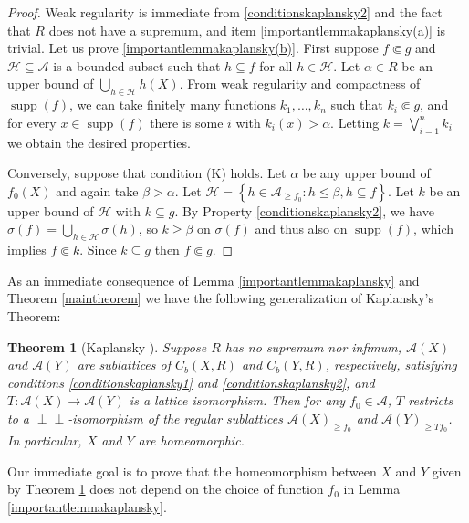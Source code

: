 \documentclass[letter,11pt]{amsart}
\theoremstyle{plain}		\newtheorem{theorem}[generalnumbering]{Theorem}
\theoremstyle{plain}		\newtheorem{corollary}[generalnumbering]{Corollary}
\theoremstyle{definition}		\newtheorem{definition}[generalnumbering]{Definition}
\theoremstyle{definition}		\newtheorem{example}[generalnumbering]{Example}
\theoremstyle{plain}		\newtheorem{proposition}[generalnumbering]{Proposition}
\theoremstyle{plain}		\newtheorem{lemma}[generalnumbering]{Lemma}
\theoremstyle{plain}    \newtheorem{plainstyle}[generalnumbering]{\namefordifferentenvironment}
\theoremstyle{plain}    \newtheorem*{plainstyle*}{\namefordifferentenvironment}
\theoremstyle{definition}    \newtheorem{definitionstyle}[generalnumbering]{\namefordifferentenvironment}
\theoremstyle{definition}    \newtheorem*{definitionstyle*}{\namefordifferentenvironment}
\newcommand{\perpp}{\perp\!\!\!\perp}
\DeclareMathOperator{\supp}{supp}
\begin{document}
\begin{proof}
	Weak regularity is immediate from \ref{conditionskaplansky2} and the fact that $R$ does not have a supremum, and item \ref{importantlemmakaplansky(a)} is trivial. Let us prove \ref{importantlemmakaplansky(b)}. First suppose $f\Subset g$ and $\mathcal{H}\subseteq\mathcal{A}$ is a bounded subset such that $h\subseteq f$ for all $h\in \mathcal{H}$. Let $\alpha\in R$ be an upper bound of $\bigcup_{h\in\mathcal{H}}h(X)$. From weak regularity and compactness of $\supp(f)$, we can take finitely many functions $k_1,\ldots,k_n$ such that $k_i\Subset g$, and for every $x\in\supp(f)$ there is some $i$ with $k_i(x)>\alpha$. Letting $k=\bigvee_{i=1}^n k_i$ we obtain the desired properties.
	
	Conversely, suppose that condition (K) holds. Let $\alpha$ be any upper bound of $f_0(X)$ and again take $\beta>\alpha$. Let $\mathscr{H}=\left\{h\in\mathcal{A}_{\geq f_0}:h\leq \beta, h\subseteq f\right\}$. Let $k$ be an upper bound of $\mathcal{H}$ with $k\subseteq g$. By Property \ref{conditionskaplansky2}, we have $\sigma(f)=\bigcup_{h\in\mathscr{H}}\sigma(h)$, so $k\geq\beta$ on $\sigma(f)$ and thus also on $\supp(f)$, which implies $f\Subset k$. Since $k\subseteq g$ then $f\Subset g$.
\end{proof}

As an immediate consequence of Lemma \ref{importantlemmakaplansky} and Theorem \ref{maintheorem} we have the following generalization of Kaplansky's Theorem:

\begin{theorem}[Kaplansky \cite{MR0020715}]\label{theoremkaplansky}
	Suppose $R$ has no supremum nor infimum, $\mathcal{A}(X)$ and $\mathcal{A}(Y)$ are sublattices of $C_b(X,R)$ and $C_b(Y,R)$, respectively, satisfying conditions \ref{conditionskaplansky1} and \ref{conditionskaplansky2}, and $T\colon\mathcal{A}(X)\to\mathcal{A}(Y)$ is a lattice isomorphism. Then for any $f_0\in\mathcal{A}$, $T$ restricts to a $\perpp$-isomorphism of the regular sublattices $\mathcal{A}(X)_{\geq f_0}$ and $\mathcal{A}(Y)_{\geq Tf_0}$. In particular, $X$ and $Y$ are homeomorphic.
\end{theorem}

Our immediate goal is to prove that the homeomorphism between $X$ and $Y$ given by Theorem \ref{theoremkaplansky} does not depend on the choice of function $f_0$ in Lemma \ref{importantlemmakaplansky}.
\end{document}
